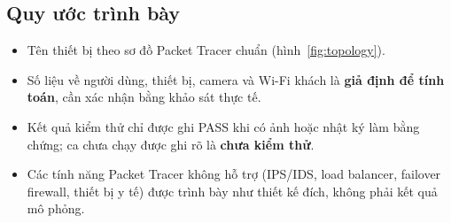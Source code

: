 \subsection{Quy ước trình bày}
\begin{itemize}[noitemsep,topsep=2pt]
    \item Tên thiết bị theo sơ đồ Packet Tracer chuẩn (hình~\ref{fig:topology}).
    \item Số liệu về người dùng, thiết bị, camera và Wi-Fi khách là \textbf{giả định để tính toán}, cần xác nhận bằng khảo sát thực tế.
    \item Kết quả kiểm thử chỉ được ghi PASS khi có ảnh hoặc nhật ký làm bằng chứng; ca chưa chạy được ghi rõ là \textbf{chưa kiểm thử}.
    \item Các tính năng Packet Tracer không hỗ trợ (IPS/IDS, load balancer, failover firewall, thiết bị y tế) được trình bày như thiết kế đích, không phải kết quả mô phỏng.
\end{itemize}

\newpage

\newpage

\newpage

\newpage

\newpage

\newpage

\newpage


